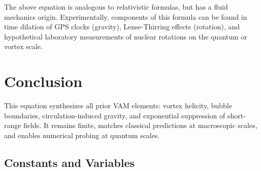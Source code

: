 The above equation is analogous to relativistic formulas, but has a fluid mechanics origin. Experimentally, components of this formula can be found in time dilation of GPS clocks (gravity), Lense-Thirring effects (rotation), and hypothetical laboratory measurements of nuclear rotations on the quantum or vortex scale.

\section*{Conclusion}
This equation synthesizes all prior VAM elements: vortex helicity, bubble boundaries, circulation-induced gravity, and exponential suppression of short-range fields. It remains finite, matches classical predictions at macroscopic scales, and enables numerical probing at quantum scales.

\subsection{Constants and Variables}

